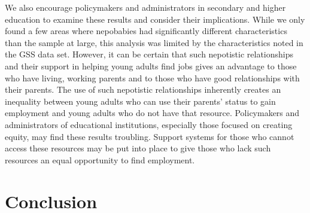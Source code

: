 \documentclass[12pt]{article}
\begin{document}
We also encourage policymakers and administrators in secondary and higher education to examine these results and consider their implications. While we only found a few areas where nepobabies had significantly different characteristics than the sample at large, this analysis was limited by the characteristics noted in the GSS data set. However, it can be certain that such nepotistic relationships and their support in helping young adults find jobs gives an advantage to those who have living, working parents and to those who have good relationships with their parents. The use of such nepotistic relationships inherently creates an inequality between young adults who can use their parents’ status to gain employment and young adults who do not have that resource. Policymakers and administrators of educational institutions, especially those focused on creating equity, may find these results troubling. Support systems for those who cannot access these resources may be put into place to give those who lack such resources an equal opportunity to find employment.


\section{Conclusion}
\label{sec:conclusion}
\end{document}
